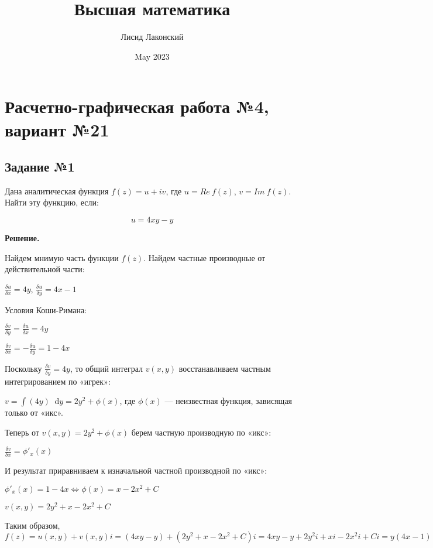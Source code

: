 \documentclass{article}
\title{Высшая математика}
\author{Лисид Лаконский}
\date{May 2023}
\newcommand*\diff{\mathop{}\!\mathrm{d}}
\begin{document}
\raggedright

\maketitle

\tableofcontents
\pagebreak

\section{Расчетно-графическая работа №4, вариант №21}

\subsection{Задание №1}

Дана аналитическая функция $f(z) = u + i v$, где $u = Re \ f(z)$, $v = Im \ f(z)$. Найти эту функцию, если:

$$
u = 4 x y - y
$$

\textbf{Решение.}

Найдем мнимую часть функции $f(z)$. Найдем частные производные от действительной части:

$\frac{\delta u}{\delta x} = 4 y$, $\frac{\delta u}{\delta y} = 4 x - 1$

Условия Коши-Римана:

$\frac{\delta v}{\delta y} = \frac{\delta u}{\delta x} = 4 y$

$\frac{\delta v}{\delta x} = -\frac{\delta u}{\delta y} = 1 - 4 x$

Поскольку $\frac{\delta v}{\delta y} = 4 y$, то общий интеграл $v(x, y)$ восстанавливаем частным интегрированием по «игрек»:

$v = \int (4 y) \diff y = 2 y^2 + \phi (x)$, где $\phi (x)$ — неизвестная функция, зависящая только от «икс».

Теперь от $v(x, y) = 2 y^2 + \phi (x)$  берем частную производную по «икс»:

$\frac{\delta v}{\delta x} = \phi'_x(x)$

И результат приравниваем к изначальной частной производной по «икс»:

$\phi'_x(x) = 1 - 4 x \Longleftrightarrow \phi(x) = x - 2x^2 + C$

$v(x, y) = 2 y^2 + x - 2x^2 + C$

Таким образом, $f(z) = u (x, y) + v (x, y) i = (4 x y - y) + (2 y^2 + x - 2x^2 + C) i = 4 x y - y + 2y^2 i + x i - 2x^2 i + C i = y (4x - 1) + 2 i (y^2 - x^2) + x i + C i$
\end{document}
